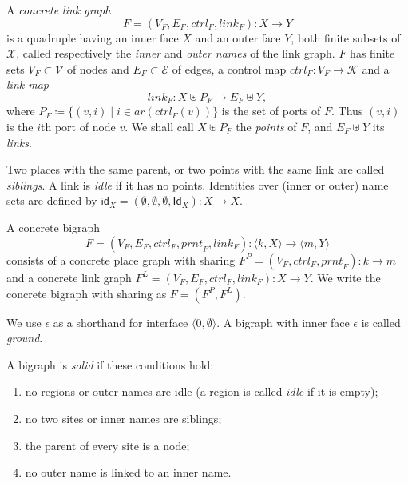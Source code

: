 \documentclass[runningheads]{llncs}
\newcommand\ctrl{\mathit{ctrl}}
\newcommand\prnt{\mathit{prnt}}
\newcommand\link{\mathit{link}}
\newcommand\ar{\mathit{ar}}
\newcommand\id{\mathsf{id}}
\newcommand\Id{\mathsf{Id}}
\begin{document}
\begin{definition}
  A \emph{concrete link graph}
  \[ F = (V_F, E_F, \ctrl_F, \link_F) : X \to Y \]
  is a quadruple having an inner face $X$ and an outer face $Y$, both finite
  subsets of $\mathcal{X}$, called respectively the \emph{inner} and
  \emph{outer names} of the link graph. $F$ has finite sets $V_F \subset
  \mathcal{V}$ of nodes and $E_F \subset \mathcal{E}$ of edges, a control map
  $\ctrl_F : V_F \to \mathcal{K}$ and a \emph{link map}
  \[ \link_F : X \uplus P_F \to E_F \uplus Y, \]
  where $P_F \coloneqq \{ (v, i) \mid i \in \ar(\ctrl_F(v)) \}$ is the set of
  ports of $F$. Thus $(v, i)$ is the $i$th port of node $v$. We shall call $X
  \uplus P_F$ the \emph{points} of $F$, and $E_F \uplus Y$ its \emph{links}.
\end{definition}

Two places with the same parent, or two points with the same link are called
\emph{siblings}. A link is \emph{idle} if it has no points. Identities over
(inner or outer) name sets are defined by $\id_X = (\emptyset, \emptyset,
\emptyset, \Id_X) : X \to X$.

\begin{definition}
  A concrete bigraph
  \[ F = (V_F, E_F, \ctrl_F, \prnt_F, \link_F) : \langle k, X \rangle \to
    \langle m, Y \rangle \]
  consists of a concrete place graph with sharing $F^P = (V_F, \ctrl_F, \prnt_F)
  : k \to m$ and a concrete link graph $F^L = (V_F, E_F, \ctrl_F, \link_F) : X
  \to Y$. We write the concrete bigraph with sharing as $F = (F^P, F^L)$.
\end{definition}

We use $\epsilon$ as a shorthand for interface $\langle 0, \emptyset \rangle$. A
bigraph with inner face $\epsilon$ is called \emph{ground}.

\begin{definition}
  A bigraph is \emph{solid} if these conditions hold:
  \begin{enumerate}
  \item no regions or outer names are idle (a region is called \emph{idle}
    if it is empty);
  \item no two sites or inner names are siblings;
  \item the parent of every site is a node;
  \item no outer name is linked to an inner name.
  \end{enumerate}
\end{definition}
\end{document}
